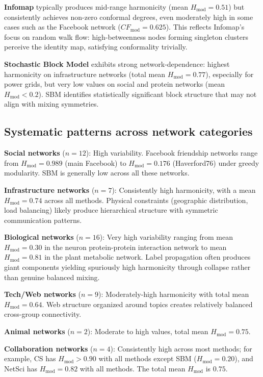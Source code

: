 \documentclass[twocolumn,superscriptaddress,tightenlines,aps,prx,floatfix]{revtex4-2}
\begin{document}
\begin{bibunit}
\textbf{Infomap} typically produces mid-range harmonicity (mean $H_{\text{mod}} = 0.51$) but consistently achieves non-zero conformal degrees, even moderately high in some cases such as the Facebook network ($CF_{\text{mod}} = 0.625$). This reflects Infomap's focus on random walk flow: high-betweenness nodes forming singleton clusters perceive the identity map, satisfying conformality trivially.

\textbf{Stochastic Block Model} exhibits strong network-dependence: highest harmonicity on infrastructure networks (total mean $H_{\text{mod}} = 0.77$), especially for power grids, but very low values on social and protein networks (mean $H_{\text{mod}} < 0.2$). SBM identifies statistically significant block structure that may not align with mixing symmetries.

\subsection{Systematic patterns across network categories}

\textbf{Social networks} ($n=12$): High variability. Facebook friendship networks range from $H_{\text{mod}} = 0.989$ (main Facebook) to $H_{\text{mod}} = 0.176$ (Haverford76) under greedy modularity. SBM is generally low across all these networks.

\textbf{Infrastructure networks} ($n=7$): Consistently high harmonicity, with a mean $H_{\text{mod}} = 0.74$ across all methods. Physical constraints (geographic distribution, load balancing) likely produce hierarchical structure with symmetric communication patterns.

\textbf{Biological networks} ($n=16$): Very high variability ranging from mean $H_{\text{mod}} = 0.30$ in the neuron protein-protein interaction network to mean $H_{\text{mod}} = 0.81$ in the plant metabolic network. Label propagation often produces giant components yielding spuriously high harmonicity through collapse rather than genuine balanced mixing.

\textbf{Tech/Web networks} ($n=9$): Moderately-high harmonicity with total mean $H_{\text{mod}} = 0.64$.
Web structure organized around topics creates relatively balanced cross-group connectivity.

\textbf{Animal networks} ($n=2$): Moderate to high values, total mean $H_{\text{mod}} = 0.75$.

\textbf{Collaboration networks} ($n=4$): Consistently high across most methods; for example, CS has $H_{\text{mod}} > 0.90$ with all methods except SBM ($H_{\text{mod}} = 0.20$), and NetSci has $H_{\text{mod}} = 0.82$ with all methods. The total mean $H_{\text{mod}}$ is $0.75$.


\end{bibunit}
\end{document}
